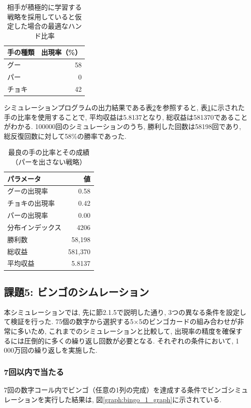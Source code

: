 \documentclass[a4j, 12pt ]{jarticle}
\begin{document}
\begin{table}[H]
  \centering
  \caption{相手が積極的に学習する戦略を採用していると仮定した場合の最適なハンド比率}\label{tab:best_ratio_ai}
  \begin{tabular}{@{}l|r@{}}
    \hline
    手の種類 & 出現率（\%） \\
    \hline
    グー & 58 \\
    パー & 0 \\
    チョキ & 42 \\
    \hline
  \end{tabular}
\end{table}

シミュレーションプログラムの出力結果である表\ref{tab:best_distribution_case_ai}を参照すると, 表\ref{tab:best_ratio_ai}に示された手の比率を使用することで, 平均収益は5.8137となり, 総収益は581370であることがわかる. 100000回のシミュレーションのうち, 勝利した回数は58198回であり, 総反復回数に対して58\%の勝率であった.\\

\begin{table}[H]
  \centering
  \caption{最良の手の比率とその成績（パーを出さない戦略）}\label{tab:best_distribution_case_ai}
  \begin{tabular}{@{}l|r@{}}
    \hline
    パラメータ & 値 \\
    \hline
    グーの出現率 & 0.58 \\
    チョキの出現率 & 0.42 \\
    パーの出現率 & 0.00 \\
    分布インデックス & 4206 \\
    勝利数 & 58,198 \\
    総収益 & 581,370 \\
    平均収益 & 5.8137 \\
    \hline
  \end{tabular}
\end{table}
\subsection{課題5: ビンゴのシムレーション}
本シミュレーションでは, 先に節2.1.5で説明した通り, 3つの異なる条件を設定して検証を行った. 75個の数字から選択する5×5のビンゴカードの組み合わせが非常に多いため, これまでのシミュレーションと比較して, 出現率の精度を確保するには圧倒的に多くの繰り返し回数が必要となる. それぞれの条件において, 1\,000万回の繰り返しを実施した.\\
\subsubsection{7回以内で当たる}
7回の数字コール内でビンゴ（任意の1列の完成）を達成する条件でビンゴシミュレーションを実行した結果は, 図\ref{graph:bingo_1_graph}に示されている.\\
\end{document}
